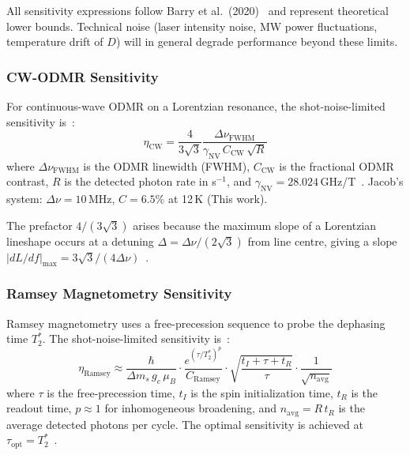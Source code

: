 All sensitivity expressions follow Barry et al.\ (2020)~\cite{Barry2020} and represent
theoretical lower bounds. Technical noise (laser intensity noise, MW power fluctuations,
temperature drift of $D$) will in general degrade performance beyond these limits.

\subsubsection{CW-ODMR Sensitivity}
\label{sec:cw_sensitivity}

For continuous-wave ODMR on a Lorentzian resonance, the shot-noise-limited sensitivity
is~\cite{Barry2020}: %
\begin{equation}
  \eta_\mathrm{CW} = \frac{4}{3\sqrt{3}}
                     \frac{\Delta\nu_\mathrm{FWHM}}
                          {\gamma_\mathrm{NV}\, C_\mathrm{CW}\, \sqrt{R}}
  \label{eq:cw_sensitivity}
\end{equation}
where $\Delta\nu_\mathrm{FWHM}$ is the ODMR linewidth (FWHM), $C_\mathrm{CW}$ is the
fractional ODMR contrast, $R$ is the detected photon rate in s$^{-1}$, and
$\gamma_\mathrm{NV} = 28.024$\,GHz/T~\cite{Doherty2013}. %
Jacob's system: $\Delta\nu = 10$\,MHz, $C = 6.5\%$ at 12\,K (This work).

The prefactor $4/(3\sqrt{3})$ arises because the maximum slope of a Lorentzian lineshape
occurs at a detuning $\Delta = \Delta\nu/(2\sqrt{3})$ from line centre, giving a slope
$|dL/df|_\mathrm{max} = 3\sqrt{3}/(4\Delta\nu)$~\cite{Barry2020}. %

\subsubsection{Ramsey Magnetometry Sensitivity}
\label{sec:ramsey_sensitivity}

Ramsey magnetometry uses a free-precession sequence to probe the dephasing time $T_2^*$.
The shot-noise-limited sensitivity is~\cite{Barry2020}: %
\begin{equation}
  \eta_\mathrm{Ramsey} \approx
    \frac{\hbar}{\Delta m_s\, g_e\, \mu_B}
    \cdot \frac{e^{(\tau/T_2^*)^p}}{C_\mathrm{Ramsey}}
    \cdot \sqrt{\frac{t_I + \tau + t_R}{\tau}}
    \cdot \frac{1}{\sqrt{n_\mathrm{avg}}}
  \label{eq:ramsey_sensitivity}
\end{equation}
where $\tau$ is the free-precession time, $t_I$ is the spin initialization time, $t_R$
is the readout time, $p \approx 1$ for inhomogeneous broadening, and
$n_\mathrm{avg} = R\, t_R$ is the average detected photons per cycle. The optimal
sensitivity is achieved at $\tau_\mathrm{opt} = T_2^*$~\cite{Barry2020}.

